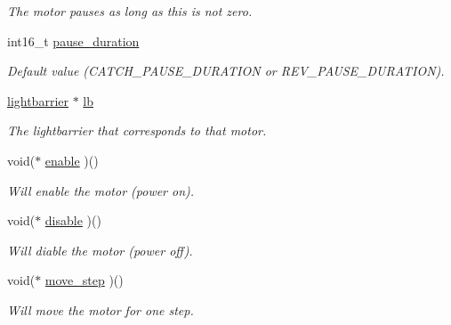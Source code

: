 \begin{CompactItemize}
\begin{CompactList}\small\item\em The motor pauses as long as this is not zero. \item\end{CompactList}\item 
\hypertarget{structstepper__motor__t_8d1622d7b7bfa1be48ceeaa0c1691e26}{
int16\_\-t \hyperlink{structstepper__motor__t_8d1622d7b7bfa1be48ceeaa0c1691e26}{pause\_\-duration}}
\label{structstepper__motor__t_8d1622d7b7bfa1be48ceeaa0c1691e26}

\begin{CompactList}\small\item\em Default value (CATCH\_\-PAUSE\_\-DURATION or REV\_\-PAUSE\_\-DURATION). \item\end{CompactList}\item 
\hypertarget{structstepper__motor__t_f134d2e58473638fa2a0f399caf641f7}{
\hyperlink{structlightbarrier__t}{lightbarrier} $\ast$ \hyperlink{structstepper__motor__t_f134d2e58473638fa2a0f399caf641f7}{lb}}
\label{structstepper__motor__t_f134d2e58473638fa2a0f399caf641f7}

\begin{CompactList}\small\item\em The lightbarrier that corresponds to that motor. \item\end{CompactList}\item 
\hypertarget{structstepper__motor__t_5917b6c46ec2e10be4a7c91e5ecbfde5}{
void($\ast$ \hyperlink{structstepper__motor__t_5917b6c46ec2e10be4a7c91e5ecbfde5}{enable} )()}
\label{structstepper__motor__t_5917b6c46ec2e10be4a7c91e5ecbfde5}

\begin{CompactList}\small\item\em Will enable the motor (power on). \item\end{CompactList}\item 
\hypertarget{structstepper__motor__t_3de57827f6cd4c85b9a632d5073e5dac}{
void($\ast$ \hyperlink{structstepper__motor__t_3de57827f6cd4c85b9a632d5073e5dac}{disable} )()}
\label{structstepper__motor__t_3de57827f6cd4c85b9a632d5073e5dac}

\begin{CompactList}\small\item\em Will diable the motor (power off). \item\end{CompactList}\item 
\hypertarget{structstepper__motor__t_70f57cb4e3039c8c3cf145cecec3aba7}{
void($\ast$ \hyperlink{structstepper__motor__t_70f57cb4e3039c8c3cf145cecec3aba7}{move\_\-step} )()}
\label{structstepper__motor__t_70f57cb4e3039c8c3cf145cecec3aba7}

\begin{CompactList}\small\item\em Will move the motor for one step. \item\end{CompactList}\end{CompactItemize}


